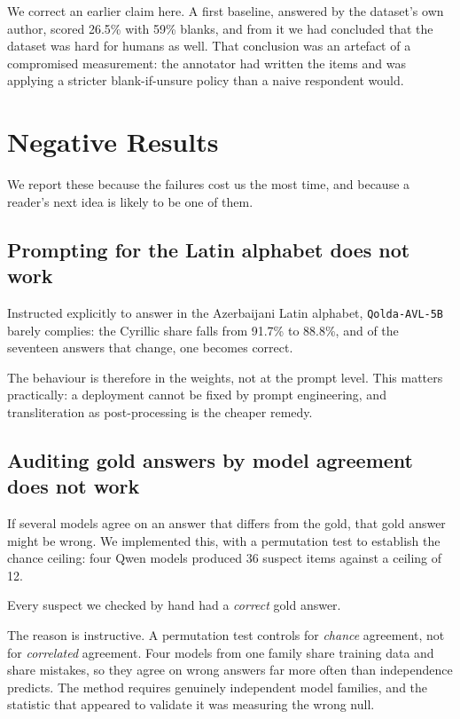\documentclass[final]{clv2025}
\begin{document}
We correct an earlier claim here. A first baseline, answered by the dataset's
own author, scored 26.5\% with 59\% blanks, and from it we had concluded that
the dataset was hard for humans as well. That conclusion was an artefact of a
compromised measurement: the annotator had written the items and was applying a
stricter blank-if-unsure policy than a naive respondent would.

\section{Negative Results}

We report these because the failures cost us the most time, and because a
reader's next idea is likely to be one of them.

\subsection{Prompting for the Latin alphabet does not work}

Instructed explicitly to answer in the Azerbaijani Latin alphabet,
\texttt{Qolda-AVL-5B} barely complies: the Cyrillic share falls from 91.7\% to
88.8\%, and of the seventeen answers that change, one becomes correct.

The behaviour is therefore in the weights, not at the prompt level. This
matters practically: a deployment cannot be fixed by prompt engineering, and
transliteration as post-processing is the cheaper remedy.

\subsection{Auditing gold answers by model agreement does not work}

If several models agree on an answer that differs from the gold, that gold
answer might be wrong. We implemented this, with a permutation test to
establish the chance ceiling: four Qwen models produced 36 suspect items
against a ceiling of 12.

Every suspect we checked by hand had a \emph{correct} gold answer.

The reason is instructive. A permutation test controls for \emph{chance}
agreement, not for \emph{correlated} agreement. Four models from one family
share training data and share mistakes, so they agree on wrong answers far more
often than independence predicts. The method requires genuinely independent
model families, and the statistic that appeared to validate it was measuring
the wrong null.
\end{document}
